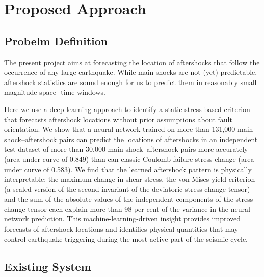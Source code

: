 \documentclass[journal,transmag]{IEEEtran}
\begin{document}
\section{Proposed Approach}
\vspace{1em}

\subsection{Probelm Definition}
\vspace{0.5em}

\par The present project aims at forecasting the location of aftershocks that follow the occurrence of any large earthquake. While main shocks are not (yet) predictable, aftershock statistics are sound enough for us to predict them in reasonably small magnitude-space- time windows.

\par Here we use a deep-learning approach to identify a static-stress-based criterion that forecasts aftershock locations without prior assumptions about fault orientation. We show that a neural network trained on more than 131,000 main shock–aftershock pairs can predict the locations of aftershocks in an independent test dataset of more than 30,000 main shock–aftershock pairs more accurately (area under curve of 0.849) than can classic Coulomb failure stress change (area under curve of 0.583). We find that the learned aftershock pattern is physically interpretable: the maximum change in shear stress, the von Mises yield criterion (a scaled version of the second invariant of the deviatoric stress-change tensor) and the sum of the absolute values of the independent components of the stress-change tensor each explain more than 98 per cent of the variance in the neural-network prediction. This machine-learning-driven insight provides improved forecasts of aftershock locations and identifies physical quantities that may control earthquake triggering during the most active part of the seismic cycle.

\vspace{1em}

\subsection{Existing System}

\vspace{0.5em}
\end{document}
